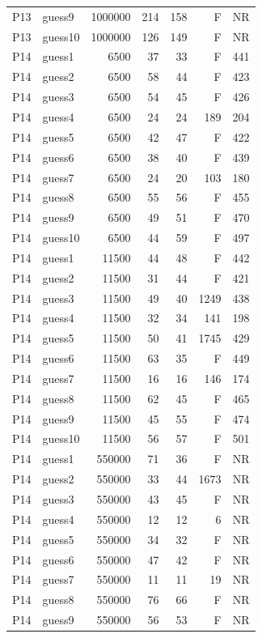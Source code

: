 {\begin{longtable}{llrrrrr}
P13 & guess9 & 1000000 & 214 & 158 & F & NR \\
P13 & guess10 & 1000000 & 126 & 149 & F & NR \\
P14 & guess1 & 6500 & 37 & 33 & F & 441 \\
P14 & guess2 & 6500 & 58 & 44 & F & 423 \\
P14 & guess3 & 6500 & 54 & 45 & F & 426 \\
P14 & guess4 & 6500 & 24 & 24 & 189 & 204 \\
P14 & guess5 & 6500 & 42 & 47 & F & 422 \\
P14 & guess6 & 6500 & 38 & 40 & F & 439 \\
P14 & guess7 & 6500 & 24 & 20 & 103 & 180 \\
P14 & guess8 & 6500 & 55 & 56 & F & 455 \\
P14 & guess9 & 6500 & 49 & 51 & F & 470 \\
P14 & guess10 & 6500 & 44 & 59 & F & 497 \\
P14 & guess1 & 11500 & 44 & 48 & F & 442 \\
P14 & guess2 & 11500 & 31 & 44 & F & 421 \\
P14 & guess3 & 11500 & 49 & 40 & 1249 & 438 \\
P14 & guess4 & 11500 & 32 & 34 & 141 & 198 \\
P14 & guess5 & 11500 & 50 & 41 & 1745 & 429 \\
P14 & guess6 & 11500 & 63 & 35 & F & 449 \\
P14 & guess7 & 11500 & 16 & 16 & 146 & 174 \\
P14 & guess8 & 11500 & 62 & 45 & F & 465 \\
P14 & guess9 & 11500 & 45 & 55 & F & 474 \\
P14 & guess10 & 11500 & 56 & 57 & F & 501 \\
P14 & guess1 & 550000 & 71 & 36 & F & NR \\
P14 & guess2 & 550000 & 33 & 44 & 1673 & NR \\
P14 & guess3 & 550000 & 43 & 45 & F & NR \\
P14 & guess4 & 550000 & 12 & 12 & 6 & NR \\
P14 & guess5 & 550000 & 34 & 32 & F & NR \\
P14 & guess6 & 550000 & 47 & 42 & F & NR \\
P14 & guess7 & 550000 & 11 & 11 & 19 & NR \\
P14 & guess8 & 550000 & 76 & 66 & F & NR \\
P14 & guess9 & 550000 & 56 & 53 & F & NR \\

\end{longtable}}
